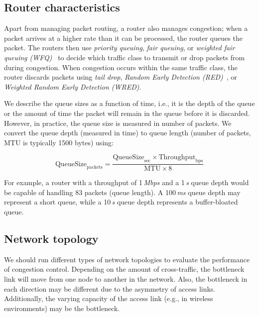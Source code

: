 \subsection{Router characteristics}


Apart from managing packet routing, a router also manages congestion; when a
packet arrives at a higher rate than it can be processed, the router queues the
packet. The routers then use \emph{priority queuing}, \emph{fair queuing}, or
\emph{weighted fair queuing (WFQ)}~\cite{rfc4594} to decide which traffic
class to transmit or drop packets from during congestion. When congestion
occurs within the same traffic class, the router discards packets using
\emph{tail drop}, \emph{Random Early Detection (RED)}~\cite{Floyd:RED}, or
\emph{Weighted Random Early Detection (WRED)}.

We describe the queue sizes as a function of time, i.e., it is the depth of
the queue or the amount of time the packet will remain in the queue before it
is discarded. However, in practice, the queue size is measured in number of
packets. We convert the queue depth (measured in time) to queue length (number
of packets, MTU is typically 1500 bytes) using:

\begin{equation*}
  \mathrm{QueueSize}_\mathrm{packets} =
    \frac{\mathrm{QueueSize}_\mathrm{sec} \times
    \mathrm{Throughput}_\mathrm{bps}}{\mathrm{MTU} \times \mathrm{8}}
\end{equation*}

For example, a router with a throughput of 1\,\emph{Mbps} and a 1\,\emph{s} queue depth would be
capable of handling 83 packets (queue length). A 100\,\emph{ms}
queue depth may represent a short queue, while a 10\,\emph{s} queue depth represents
a buffer-bloated queue.

\subsection{Network topology}

We should run different types of network topologies to evaluate the
performance of congestion control. Depending on the amount of cross-traffic,
the bottleneck link will move from one node to another in the network. Also,
the bottleneck in each direction may be different due to the asymmetry of
access links. Additionally, the varying capacity of the access link (e.g., in
wireless environments) may be the bottleneck.


